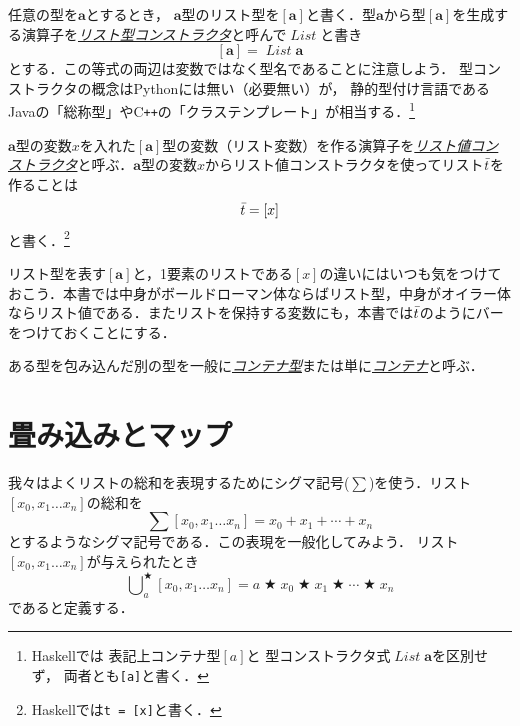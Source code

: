 \documentclass[a5paper,draft]{jsbook}
\newcommand{\programminglanguage}[1]{\textsf{#1}}
\newcommand{\cxx}{\programminglanguage{C}\texttt{++}}
\newcommand{\haskell}{\programminglanguage{Haskell}}
\newcommand{\python}{\programminglanguage{Python}}
\newcommand{\keyword}[1]{{\underline{\emph{#1}}}}
\newcommand{\code}[1]{\texttt{#1}}
\newcommand{\mathTypeParameter}[1]{\mathbf{#1}}
\newcommand{\hsklTypeParameterConstructor}[1]{\textit{#1}}
\newcommand{\mathTypeConstructor}[1]{\textit{#1}} %
\newcommand{\mathListType}[1]{\left[#1\right]}
\newcommand{\mathListVar}[1]{\Bar{#1}}
\DeclareMathOperator{\mathList}{\mathTypeConstructor{List}}
\DeclareMathOperator*{\mathFold}{\bigcup}
\newcommand{\mathBinaryOperator}[1]{\operatorname{#1}}
\newcommand{\mathAnyBinaryOperator}{\mathBinaryOperator{\bigstar}}
\DeclareMathOperator{\hsklListConstructor}{\hsklTypeParameterConstructor{List}}
\begin{document}
任意の型を$\mathTypeParameter{a}$とするとき，
$\mathTypeParameter{a}$型のリスト型を$\mathListType{\mathTypeParameter{a}}$と書く．型$\mathTypeParameter{a}$から型$\mathListType{\mathTypeParameter{a}}$を生成する演算子を\keyword{リスト型コンストラクタ}と呼んで$\hsklListConstructor$と書き
\begin{equation}
\mathListType{\mathTypeParameter{a}}=\mathList\mathTypeParameter{a}
\end{equation}
とする．この等式の両辺は変数ではなく型名であることに注意しよう．
型コンストラクタの概念は\python には無い（必要無い）が，
静的型付け言語であるJavaの「総称型」や\cxx の「クラステンプレート」が相当する．\footnote{\haskell では
表記上コンテナ型$\mathListType{a}$と
型コンストラクタ式$\mathList\mathTypeParameter{a}$を区別せず，
両者とも\code{[a]}と書く．}

$\mathTypeParameter{a}$型の変数$x$を入れた$\mathListType{\mathTypeParameter{a}}$型の変数（リスト変数）を作る演算子を\keyword{リスト値コンストラクタ}と呼ぶ．$\mathTypeParameter{a}$型の変数$x$からリスト値コンストラクタを使ってリスト$\mathListVar{t}$を作ることは
\begin{equation}
\mathListVar{t}=[x]
\end{equation}
と書く．\footnote{\haskell では\code{t = [x]}と書く．}

リスト型を表す$\mathListType{\mathTypeParameter{a}}$と，1要素のリストである$[x]$の違いにはいつも気をつけておこう．本書では中身がボールドローマン体ならばリスト型，中身がオイラー体ならリスト値である．またリストを保持する変数にも，本書では$\mathListVar{t}$のようにバーをつけておくことにする．

ある型を包み込んだ別の型を一般に\keyword{コンテナ型}または単に\keyword{コンテナ}と呼ぶ．

\section{畳み込みとマップ}

我々はよくリストの総和を表現するためにシグマ記号($\sum$)を使う．リスト$[x_0,x_1\dots x_n]$の総和を
\begin{equation}
\sum[x_0,x_1\dots x_n]=x_0+x_1+\dotsb+x_n
\end{equation}
とするようなシグマ記号である．この表現を一般化してみよう．
リスト$[x_0,x_1\dots x_n]$が与えられたとき
\begin{equation}
\mathFold^{\mathAnyBinaryOperator}_{a}[x_0,x_1\dots x_n]=a\mathAnyBinaryOperator x_0\mathAnyBinaryOperator x_1\mathAnyBinaryOperator\dotsb\mathAnyBinaryOperator x_n
\end{equation}
であると定義する．
\end{document}
